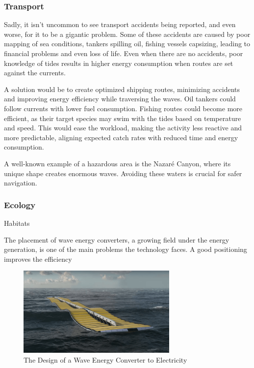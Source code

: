\subsubsection{Transport}
Sadly, it isn't uncommon to see transport accidents being reported, and even worse, for it to be a gigantic problem.
Some of these accidents are caused by poor mapping of sea conditions, tankers spilling oil, fishing vessels capsizing, leading
to financial problems and even loss of life. Even when there are no accidents, poor knowledge of tides results in higher energy consumption when routes are set against the currents.

A solution would be to create optimized shipping routes, minimizing accidents and improving energy efficiency while 
traversing the waves. Oil tankers could follow currents with lower fuel consumption. Fishing routes could become more
efficient, as their target species may swim with the tides based on temperature and speed. This would ease the workload,
making the activity less reactive and more predictable, aligning expected catch rates with reduced time and energy 
consumption.

A well-known example of a hazardous area is the Nazaré Canyon, where its unique shape creates enormous waves. 
Avoiding these waters is crucial for safer navigation.

\subsubsection{Ecology}


Habitats 

The placement of wave energy converters, a growing field under the energy generation, is one of the main problems the
technology faces. A good positioning improves the efficiency
\begin{figure}
    \centering
    \includegraphics[width=0.7\textwidth]{images/chapter/introduction/renewable_energy.png}  %
    \caption{The Design of a Wave Energy Converter to Electricity}
    \label{fig:The Design of a Wave Energy Converter to Electricity}        
\end{figure}

